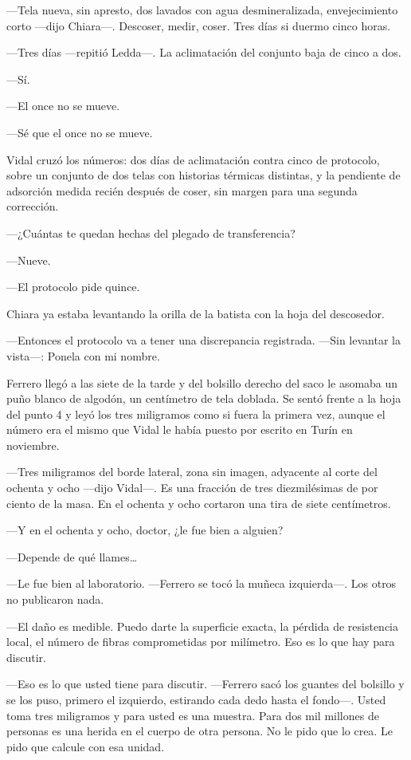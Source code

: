 ---Tela nueva, sin apresto, dos lavados con agua desmineralizada, envejecimiento corto ---dijo Chiara---. Descoser, medir, coser. Tres días si duermo cinco horas.

---Tres días ---repitió Ledda---. La aclimatación del conjunto baja de cinco a dos.

---Sí.

---El once no se mueve.

---Sé que el once no se mueve.

Vidal cruzó los números: dos días de aclimatación contra cinco de protocolo, sobre un conjunto de dos telas con historias térmicas distintas, y la pendiente de adsorción medida recién después de coser, sin margen para una segunda corrección.

---¿Cuántas te quedan hechas del plegado de transferencia?

---Nueve.

---El protocolo pide quince.

Chiara ya estaba levantando la orilla de la batista con la hoja del descosedor.

---Entonces el protocolo va a tener una discrepancia registrada. ---Sin levantar la vista---: Ponela con mi nombre.


\scenebreak


Ferrero llegó a las siete de la tarde y del bolsillo derecho del saco le asomaba un puño blanco de algodón, un centímetro de tela doblada. Se sentó frente a la hoja del punto 4 y leyó los tres miligramos como si fuera la primera vez, aunque el número era el mismo que Vidal le había puesto por escrito en Turín en noviembre.

---Tres miligramos del borde lateral, zona sin imagen, adyacente al corte del ochenta y ocho ---dijo Vidal---. Es una fracción de tres diezmilésimas de por ciento de la masa. En el ochenta y ocho cortaron una tira de siete centímetros.

---Y en el ochenta y ocho, doctor, ¿le fue bien a alguien?

---Depende de qué llames\ldots{}

---Le fue bien al laboratorio. ---Ferrero se tocó la muñeca izquierda---. Los otros no publicaron nada.

---El daño es medible. Puedo darte la superficie exacta, la pérdida de resistencia local, el número de fibras comprometidas por milímetro. Eso es lo que hay para discutir.

---Eso es lo que usted tiene para discutir. ---Ferrero sacó los guantes del bolsillo y se los puso, primero el izquierdo, estirando cada dedo hasta el fondo---. Usted toma tres miligramos y para usted es una muestra. Para dos mil millones de personas es una herida en el cuerpo de otra persona. No le pido que lo crea. Le pido que calcule con esa unidad.


